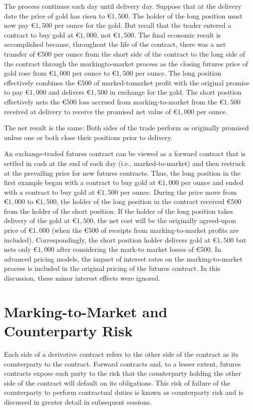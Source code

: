 \documentclass[11pt]{article}
\begin{document}
The process continues each day until delivery day. Suppose that at the delivery date the price of gold has risen to $€ 1,500$. The holder of the long position must now pay $€ 1,500$ per ounce for the gold. But recall that the trader entered a contract to buy gold at $€ 1,000$, not $€ 1,500$. The final economic result is accomplished because, throughout the life of the contract, there was a net transfer of $€ 500$ per ounce from the short side of the contract to the long side of the contract through the markingto-market process as the closing futures price of gold rose from $€ 1,000$ per ounce to $€ 1,500$ per ounce. The long position effectively combines the $€ 500$ of marked-tomarket profit with the original promise to pay $€ 1,000$ and delivers $€ 1,500$ in exchange for the gold. The short position effectively nets the $€ 500$ loss accrued from marking-to-market from the $€ 1,500$ received at delivery to receive the promised net value of $€ 1,000$ per ounce.

The net result is the same: Both sides of the trade perform as originally promised unless one or both close their positions prior to delivery.

An exchange-traded futures contract can be viewed as a forward contract that is settled in cash at the end of each day (i.e., marked-to-market) and then restruck at the prevailing price for new futures contracts. Thus, the long position in the first example began with a contract to buy gold at $€ 1,000$ per ounce and ended with a contract to buy gold at $€ 1,500$ per ounce. During the price move from $€ 1,000$ to $€ 1,500$, the holder of the long position in the contract received $€ 500$ from the holder of the short position. If the holder of the long position takes delivery of the gold at $€ 1,500$, the net cost will be the originally agreed-upon price of $€ 1,000$ (when the $€ 500$ of receipts from marking-to-market profits are included). Correspondingly, the short position holder delivers gold at $€ 1,500$ but nets only $€ 1,000$ after considering the mark-to market losses of $€ 500$. In advanced pricing models, the impact of interest rates on the marking-to-market process is included in the original pricing of the futures contract. In this discussion, these minor interest effects were ignored.

\section*{Marking-to-Market and Counterparty Risk}
Each side of a derivative contract refers to the other side of the contract as its counterparty to the contract. Forward contracts and, to a lesser extent, futures contracts expose each party to the risk that the counterparty holding the other side of the contract will default on its obligations. This risk of failure of the counterparty to perform contractual duties is known as counterparty risk and is discussed in greater detail in subsequent sessions.
\end{document}
